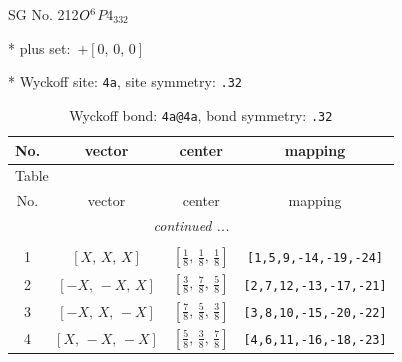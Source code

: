 \documentclass[fleqn,8pt]{jsarticle}
\begin{document}
\setcounter{MaxMatrixCols}{32}

\renewcommand{\tablename}{Table~}
\renewcommand{\figurename}{Figure~}
\begin{center}
\LARGE
SG No. 212\quad$O_{\rm }^{6}$\quad$P4_332$\quad[ cubic ]
\end{center}

* plus set:\,\,\,$+\left[ 0,\, 0,\, 0 \right]$


* Wyckoff site: {\tt 4a}, site symmetry: {\tt .32}
\renewcommand{\arraystretch}{1.2}
\begin{longtable}{cccc}
\caption{Wyckoff bond: {\tt 4a@4a}, bond symmetry: {\tt .32}}
 \\
 \hline \hline
No. & vector & center & mapping \\ \hline \endfirsthead

\multicolumn{3}{l}{\tablename\ \thetable{}} \\
 \hline \hline
No. & vector & center & mapping \\ \hline \endhead

 \hline \hline
\multicolumn{3}{r}{\footnotesize\it continued ...} \\ \endfoot

 \hline \hline
\multicolumn{3}{r}{} \\ \endlastfoot

1 & $\left[ X,\, X,\, X \right]$ & $\left[ \frac{1}{8},\, \frac{1}{8},\, \frac{1}{8} \right]$ & {\tt [1,5,9,-14,-19,-24]} \\ \hline
2 & $\left[ - X,\, - X,\, X \right]$ & $\left[ \frac{3}{8},\, \frac{7}{8},\, \frac{5}{8} \right]$ & {\tt [2,7,12,-13,-17,-21]} \\ \hline
3 & $\left[ - X,\, X,\, - X \right]$ & $\left[ \frac{7}{8},\, \frac{5}{8},\, \frac{3}{8} \right]$ & {\tt [3,8,10,-15,-20,-22]} \\ \hline
4 & $\left[ X,\, - X,\, - X \right]$ & $\left[ \frac{5}{8},\, \frac{3}{8},\, \frac{7}{8} \right]$ & {\tt [4,6,11,-16,-18,-23]} \\
\end{longtable}
\renewcommand{\arraystretch}{1.2}
\end{document}
